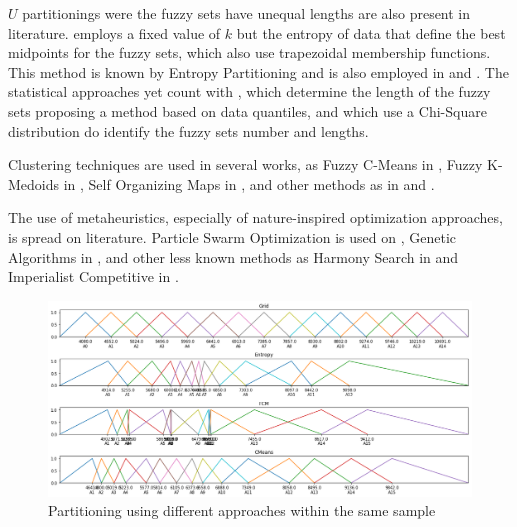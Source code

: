 $U$ partitionings were the fuzzy sets have unequal lengths are also present in literature. \cite{Cheng2006a} employs a fixed value of $k$ but the entropy of data that define the best midpoints for the fuzzy sets, which also use trapezoidal membership functions. This method is known by Entropy Partitioning and is also employed in \cite{Cheng2008} and \cite{Chen2014}. The statistical approaches yet count with \cite{Ismail2015}, which determine the length of the fuzzy sets proposing a method based on data quantiles, and \cite{Yang2017} which use a Chi-Square distribution do identify the fuzzy sets number and lengths.

Clustering techniques are used in several works, as Fuzzy C-Means in \cite{Li2008b, Askari2015, Bas2015, Sun2015, Yolcu2017}, Fuzzy K-Medoids in \cite{Dincer2018}, Self Organizing Maps in \cite{Bahrepour2011}, and other methods as in \cite{Saberi2017} and \cite{Bose2017}.

The use of metaheuristics, especially of nature-inspired optimization approaches, is spread on literature. Particle Swarm Optimization is used on \cite{Davari2009, Kuo2009, Hsu2010, Huang2011, Zhang2018a}, Genetic Algorithms in \cite{Chen2006a, Enayatifar2013, Zhang2018}, and other less known methods as Harmony Search in \cite{Talarposhti2016a, Jiang2017} and Imperialist Competitive in \cite{Sadaei2017}. 

\begin{figure}
    \centering
    \includegraphics[width=\textwidth]{figures/partitioners.png}
    \caption{Partitioning using different approaches within the same sample}
    \label{fig:partitioners}
\end{figure}

